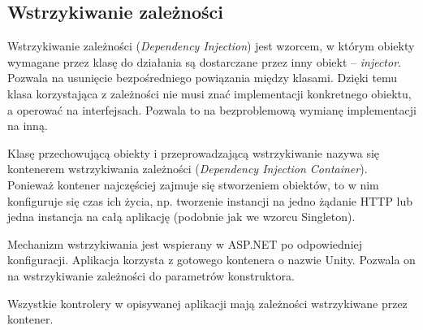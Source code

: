 \subsection*{Wstrzykiwanie zależności}

Wstrzykiwanie zależności (\textit{Dependency Injection}) jest wzorcem, w którym obiekty wymagane przez klasę do działania są dostarczane przez inny obiekt -- \textit{injector}. Pozwala na usunięcie bezpośredniego powiązania między klasami\cite{wstrzykiwanie}. Dzięki temu klasa korzystająca z zależności nie musi znać implementacji konkretnego obiektu, a operować na interfejsach. Pozwala to na bezproblemową wymianę implementacji na inną.

Klasę przechowującą obiekty i przeprowadzającą wstrzykiwanie nazywa się kontenerem wstrzykiwania zależności (\textit{Dependency Injection Container}). Ponieważ kontener najczęściej zajmuje się stworzeniem obiektów, to w nim konfiguruje się czas ich życia, np. tworzenie instancji na jedno żądanie HTTP lub jedna instancja na całą aplikację (podobnie jak we wzorcu Singleton).

Mechanizm wstrzykiwania jest wspierany w ASP.NET po odpowiedniej konfiguracji. Aplikacja korzysta z gotowego kontenera o nazwie Unity. Pozwala on na wstrzykiwanie zależności do parametrów konstruktora.

Wszystkie kontrolery w opisywanej aplikacji mają zależności wstrzykiwane przez kontener.

